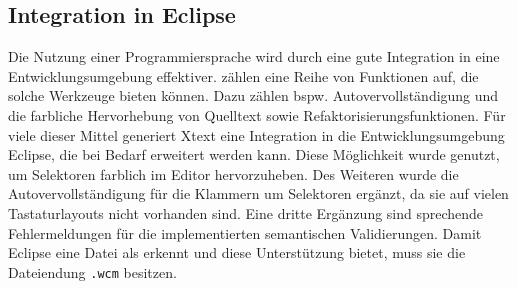 \subsection{Integration in Eclipse}
    Die Nutzung einer Programmiersprache wird durch eine gute Integration in eine
    Entwicklungsumgebung effektiver.
    \citet[Kapitel 12.]{voelter:DslEngineering} zählen eine Reihe von
    Funktionen auf, die solche Werkzeuge bieten können.
    Dazu zählen bspw. Autovervollständigung und die farbliche Hervorhebung von Quelltext
    sowie Refaktorisierungsfunktionen.
    Für viele dieser Mittel generiert Xtext eine Integration
    in die Entwicklungsumgebung Eclipse,
    die bei Bedarf erweitert werden kann.
    Diese Möglichkeit wurde genutzt, um Selektoren farblich im Editor hervorzuheben.
    Des Weiteren wurde die Autovervollständigung für die Klammern um Selektoren ergänzt,
    da sie auf vielen Tastaturlayouts nicht vorhanden sind.
    Eine dritte Ergänzung sind sprechende Fehlermeldungen für die implementierten
    semantischen Validierungen.
    Damit Eclipse eine Datei als {\classificationModel} erkennt und diese Unterstützung bietet,
    muss sie die Dateiendung \texttt{.wcm} besitzen.
